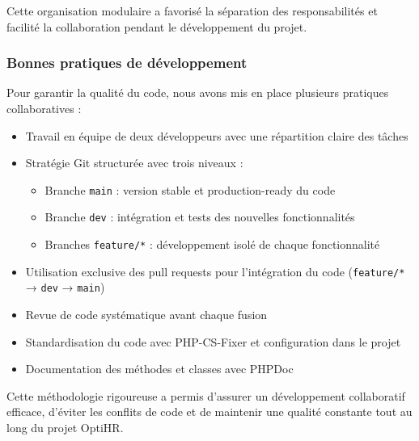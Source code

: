Cette organisation modulaire a favorisé la séparation des responsabilités et facilité la collaboration pendant le développement du projet.

\subsubsection{Bonnes pratiques de développement}
Pour garantir la qualité du code, nous avons mis en place plusieurs pratiques collaboratives :

\begin{itemize}
    \item Travail en équipe de deux développeurs avec une répartition claire des tâches
    \item Stratégie Git structurée avec trois niveaux :
    \begin{itemize}
        \item Branche \texttt{main} : version stable et production-ready du code
        \item Branche \texttt{dev} : intégration et tests des nouvelles fonctionnalités
        \item Branches \texttt{feature/*} : développement isolé de chaque fonctionnalité
    \end{itemize}
    \item Utilisation exclusive des pull requests pour l'intégration du code (\texttt{feature/*} → \texttt{dev} → \texttt{main})
    \item Revue de code systématique avant chaque fusion
    \item Standardisation du code avec PHP-CS-Fixer et configuration dans le projet
    \item Documentation des méthodes et classes avec PHPDoc
\end{itemize}

Cette méthodologie rigoureuse a permis d'assurer un développement collaboratif efficace, d'éviter les conflits de code et de maintenir une qualité constante tout au long du projet OptiHR.
\clearpage
